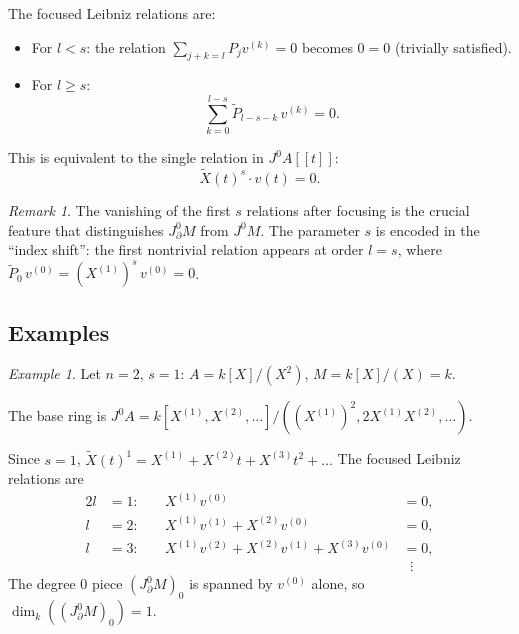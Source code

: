 \documentclass[a4paper, 12pt]{amsart}
\theoremstyle{definition}
\theoremstyle{remark}
\newtheorem{remark}[theorem]{Remark}
\newtheorem{example}[theorem]{Example}
\begin{document}
The focused Leibniz relations are:
\begin{itemize}
\item
  For $l < s$: the relation $\sum_{j+k=l} P_j v^{(k)} = 0$ becomes $0 = 0$ (trivially satisfied).
\item
  For $l \ge s$:
  \begin{equation}
    \label{eq:focused-leibniz}
    \sum_{k = 0}^{l - s} \widetilde{P}_{l - s - k}\, v^{(k)} = 0.
  \end{equation}
\end{itemize}
This is equivalent to the single relation in $J^0A[[t]]$:
\begin{equation*}
  \widetilde{X}(t)^s \cdot v(t) = 0.
\end{equation*}

\begin{remark}
  The vanishing of the first $s$ relations after focusing
  is the crucial feature that distinguishes $J^0_\partial M$ from $J^0M$.
  The parameter $s$ is encoded in the ``index shift'':
  the first nontrivial relation appears at order $l = s$,
  where $\widetilde{P}_0\,v^{(0)} = (X^{(1)})^s\, v^{(0)} = 0$.
\end{remark}

\subsection{Examples}
\label{sec:examples-focused}

\begin{example}
  \label{exa:focused-n2-s1}
  Let $n = 2$, $s = 1$: $A = k[X]/(X^2)$, $M = k[X]/(X) = k$.

  \noindent
  The base ring is $J^0A = k[X^{(1)}, X^{(2)}, \dots]/((X^{(1)})^2, 2X^{(1)}X^{(2)}, \dots)$.

  \noindent
  Since $s = 1$, $\widetilde{X}(t)^1 = X^{(1)} + X^{(2)}t + X^{(3)}t^2 + \dots$
  The focused Leibniz relations are
  \begin{alignat*}{2}
    l &= 1: &\quad X^{(1)} v^{(0)} &= 0, \\
    l &= 2: &\quad X^{(1)} v^{(1)} + X^{(2)} v^{(0)} &= 0, \\
    l &= 3: &\quad X^{(1)} v^{(2)} + X^{(2)} v^{(1)} + X^{(3)} v^{(0)} &= 0, \\
      &  &\quad &\;\;\vdots
  \end{alignat*}
  The degree $0$ piece $(J^0_\partial M)_0$ is spanned by $v^{(0)}$ alone,
  so $\dim_k((J^0_\partial M)_0) = 1$.
\end{example}
\end{document}

